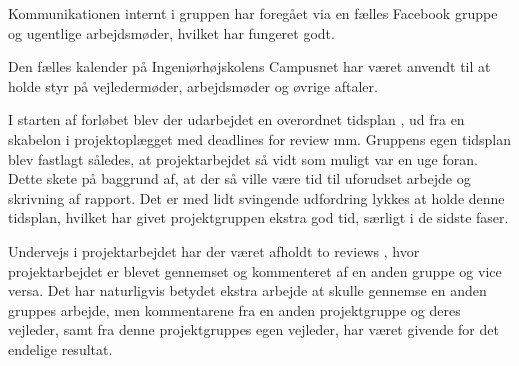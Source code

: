 Kommunikationen internt i gruppen har foregået via en fælles Facebook gruppe og ugentlige arbejdsmøder, hvilket har fungeret godt.

Den fælles kalender på Ingeniørhøjskolens Campusnet har været anvendt til at holde styr på vejledermøder, arbejdsmøder og øvrige aftaler.
 
I starten af forløbet blev der udarbejdet en overordnet tidsplan \cite{lib:Tidsplan}, ud fra en skabelon i projektoplægget \cite{lib:Projektoplaeg} med deadlines for review mm.
Gruppens egen tidsplan blev fastlagt således, at projektarbejdet så vidt som muligt var en uge foran. 
Dette skete på baggrund af, at der så ville være tid til uforudset arbejde og skrivning af rapport. 
Det er med lidt svingende udfordring lykkes at holde denne tidsplan, hvilket har givet projektgruppen ekstra god tid, særligt i de sidste faser.

Undervejs i projektarbejdet har der været afholdt to reviews \cite{lib:Review1} \cite{lib:Review2}, hvor projektarbejdet er blevet gennemset og kommenteret af en anden gruppe og vice versa. 
Det har naturligvis betydet ekstra arbejde at skulle gennemse en anden gruppes arbejde, men kommentarene fra en anden projektgruppe og deres vejleder, samt fra denne projektgruppes egen vejleder, har været givende for det endelige resultat. 
